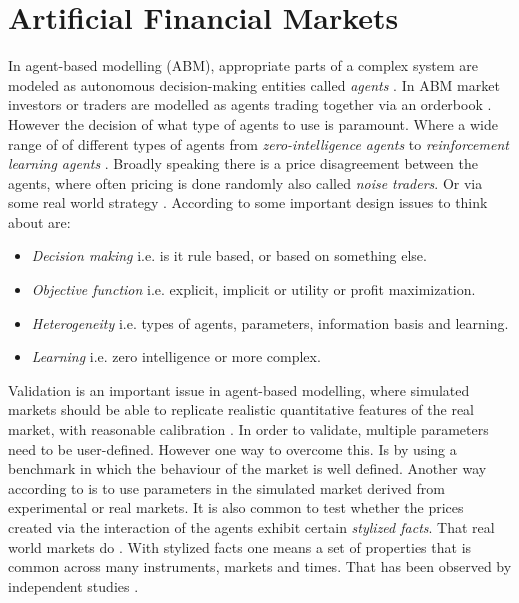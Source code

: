 \documentclass{kththesis}
\theoremstyle{definition}
\begin{document}

\newpage

\section{Artificial Financial Markets}
In agent-based modelling (ABM), appropriate parts of a complex system are modeled as autonomous decision-making entities called \textit{agents} \parencite{darley2007nasdaq}. In ABM market investors or traders are modelled as agents trading together via an orderbook \parencite{lussange2018bright}. However the decision of what type of agents to use is paramount. Where a wide range of of different types of agents from \textit{zero-intelligence agents} to \textit{reinforcement learning agents} \parencite{martinez2009evolutionary}. Broadly speaking there is a price disagreement between the agents, where often pricing is done randomly also called \textit{noise traders}. Or via some real world strategy \parencite{lussange2018bright}. According to \textcite{martinez2009evolutionary} some important design issues to think about are:

\begin{itemize}
    \item \textit{Decision making} i.e. is it rule based, or based on something else.
    \item \textit{Objective function} i.e. explicit, implicit or utility or profit maximization.
    \item \textit{Heterogeneity} i.e. types of agents, parameters, information basis and learning.
    \item \textit{Learning} i.e. zero intelligence or more complex.
\end{itemize}
Validation is an important issue in agent-based modelling, where simulated markets should be able to replicate realistic quantitative features of the real market, with reasonable calibration \parencite{martinez2009evolutionary}. In order to validate, multiple parameters need to be user-defined. However one way to overcome this. Is by using a benchmark in which the behaviour of the market is well defined. Another way according to \textcite{martinez2009evolutionary} is to use parameters in the simulated market derived from experimental or real markets. 
\newline
\newline
It is also common to test whether the prices created via the interaction of the agents exhibit certain \textit{stylized facts}. That real world markets do \parencite{brandouy2011design}. With stylized facts one means a set of properties that is common across many instruments, markets and times. That has been observed by independent studies \parencite{cont2001empirical}. 
\newpage
\end{document}
